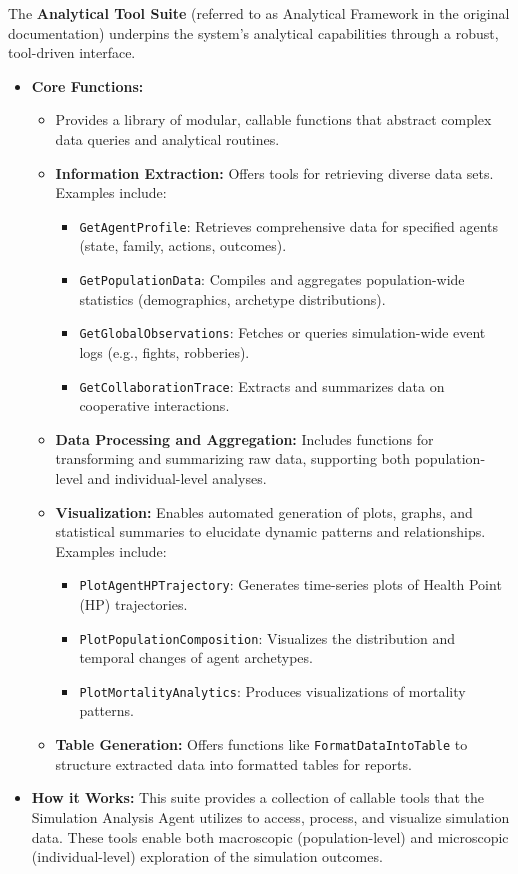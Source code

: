 The \textbf{Analytical Tool Suite} (referred to as Analytical Framework in the original documentation) underpins the system's analytical capabilities through a robust, tool-driven interface.

\begin{itemize}
    \item \textbf{Core Functions:}
    \begin{itemize}
        \item Provides a library of modular, callable functions that abstract complex data queries and analytical routines.
        \item \textbf{Information Extraction:} Offers tools for retrieving diverse data sets. Examples include:
        \begin{itemize}
            \item \texttt{GetAgentProfile}: Retrieves comprehensive data for specified agents (state, family, actions, outcomes).
            \item \texttt{GetPopulationData}: Compiles and aggregates population-wide statistics (demographics, archetype distributions).
            \item \texttt{GetGlobalObservations}: Fetches or queries simulation-wide event logs (e.g., fights, robberies).
            \item \texttt{GetCollaborationTrace}: Extracts and summarizes data on cooperative interactions.
        \end{itemize}
        \item \textbf{Data Processing and Aggregation:} Includes functions for transforming and summarizing raw data, supporting both population-level and individual-level analyses.
        \item \textbf{Visualization:} Enables automated generation of plots, graphs, and statistical summaries to elucidate dynamic patterns and relationships. Examples include:
        \begin{itemize}
            \item \texttt{PlotAgentHPTrajectory}: Generates time-series plots of Health Point (HP) trajectories.
            \item \texttt{PlotPopulationComposition}: Visualizes the distribution and temporal changes of agent archetypes.
            \item \texttt{PlotMortalityAnalytics}: Produces visualizations of mortality patterns.
        \end{itemize}
        \item \textbf{Table Generation:} Offers functions like \texttt{FormatDataIntoTable} to structure extracted data into formatted tables for reports.
    \end{itemize}
    \item \textbf{How it Works:}
    This suite provides a collection of callable tools that the Simulation Analysis Agent utilizes to access, process, and visualize simulation data. These tools enable both macroscopic (population-level) and microscopic (individual-level) exploration of the simulation outcomes.
\end{itemize}

